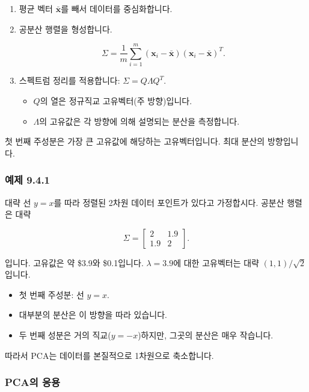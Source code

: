\documentclass[
  12pt,
  a4paper,
]{article}
\begin{document}
\begin{enumerate}
\def\labelenumi{\arabic{enumi}.}
\item
  평균 벡터 \(\bar{\mathbf{x}}\)를 빼서 데이터를 중심화합니다.
\item
  공분산 행렬을 형성합니다.

  \[\Sigma = \frac{1}{m} \sum_{i=1}^m (\mathbf{x}_i - \bar{\mathbf{x}})(\mathbf{x}_i - \bar{\mathbf{x}})^T.\]
\item
  스펙트럼 정리를 적용합니다: \(\Sigma = Q \Lambda Q^T\).

  \begin{itemize}
  \item
    \(Q\)의 열은 정규직교 고유벡터(주 방향)입니다.
  \item
    \(\Lambda\)의 고유값은 각 방향에 의해 설명되는 분산을 측정합니다.
  \end{itemize}
\end{enumerate}

첫 번째 주성분은 가장 큰 고유값에 해당하는 고유벡터입니다. 최대 분산의 방향입니다.

\subsubsection{예제 9.4.1}\label{example-941}

대략 선 \(y = x\)를 따라 정렬된 2차원 데이터 포인트가 있다고 가정합시다. 공분산 행렬은 대략

\[\Sigma =
\begin{bmatrix}
2 & 1.9 \\
1.9 & 2
\end{bmatrix}.\]

입니다. 고유값은 약 \$3.9\)와 \$0.1\)입니다. \(\lambda = 3.9\)에 대한 고유벡터는 대략 \((1,1)/\sqrt{2}\)입니다.

\begin{itemize}
\item
  첫 번째 주성분: 선 \(y = x\).
\item
  대부분의 분산은 이 방향을 따라 있습니다.
\item
  두 번째 성분은 거의 직교(\(y = -x\))하지만, 그곳의 분산은 매우 작습니다.
\end{itemize}

따라서 PCA는 데이터를 본질적으로 1차원으로 축소합니다.

\subsubsection{PCA의 응용}\label{applications-of-pca}
\end{document}
